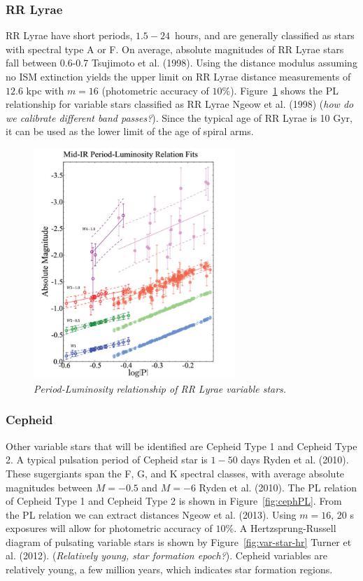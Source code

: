 \documentclass[letterpaper,11pt]{article}
\begin{document}
\subsubsection{RR Lyrae}
RR Lyrae have short periods, $1.5 - 24$~hours, and are generally classified as stars with spectral type A or F.  On average, absolute magnitudes of RR Lyrae stars fall between 0.6-0.7 Tsujimoto et al. (1998). Using the distance modulus assuming no ISM extinction yields the upper limit on RR Lyrae distance measurements of $12.6$ kpc with $m=16$ (photometric accuracy of $10\%$). Figure~\ref{fig:plrelationrrlyrae} shows the PL relationship for variable stars classified as RR Lyrae Ngeow et al. (1998) (\textit{how do we calibrate different band passes?}). Since the typical age of RR Lyrae is 10 Gyr, it can be used as the lower limit of the age of spiral arms.

\begin{figure}[]%
  \begin{center}
\centerline{\includegraphics[width=3in]{figures/PL_relation}}
\caption{\it \small{Period-Luminosity relationship of RR Lyrae variable stars. \label{fig:plrelationrrlyrae}}}
  \end{center}
\end{figure}


\subsubsection{Cepheid}

Other variable stars that will be identified are Cepheid Type 1 and Cepheid Type 2.  A typical pulsation period of Cepheid star is $1 - 50$ days Ryden et al. (2010).  These sugergiants span the F, G, and K spectral classes, with average absolute magnitudes between $M=-0.5$ and $M=-6$ Ryden et al. (2010).  The PL relation of Cepheid Type 1 and Cepheid Type 2 is shown in Figure~\ref{fig:cephPL}. From the PL relation we can extract distances Ngeow et al. (2013). Using $m=16$, 20 s exposures will allow for photometric accuracy of $10\%$.  A Hertzsprung-Russell diagram of pulsating variable stars is shown by Figure~\ref{fig:var-star-hr} Turner et al. (2012). (\textit{Relatively young, star formation epoch?}). Cepheid variables are relatively young, a few million years, which indicates star formation regions.
\end{document}
